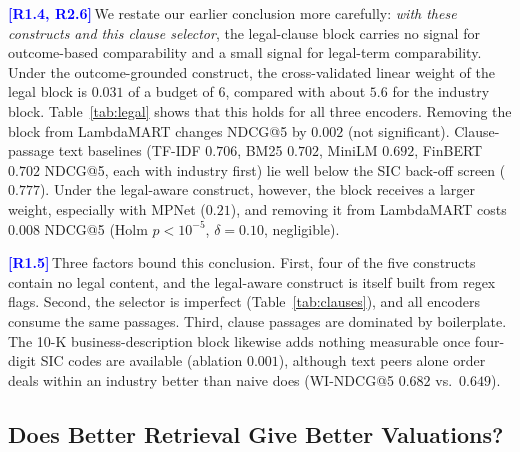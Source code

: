 \documentclass[conference]{IEEEtran}
\newcommand{\rc}[1]{\textcolor{blue}{\textbf{[#1]}}\,}
\newcommand{\rc}[1]{}
\begin{document}
\rc{R1.4, R2.6}We restate our earlier conclusion more carefully: \emph{with these constructs and this clause selector}, the legal-clause block carries no signal for outcome-based comparability and a small signal for legal-term comparability. Under the outcome-grounded construct, the cross-validated linear weight of the legal block is $0.031$ of a budget of $6$, compared with about $5.6$ for the industry block. Table~\ref{tab:legal} shows that this holds for all three encoders. Removing the block from LambdaMART changes NDCG@5 by $0.002$ (not significant). Clause-passage text baselines (TF-IDF $0.706$, BM25 $0.702$, MiniLM $0.692$, FinBERT $0.702$ NDCG@5, each with industry first) lie well below the SIC back-off screen ($0.777$). Under the legal-aware construct, however, the block receives a larger weight, especially with MPNet ($0.21$), and removing it from LambdaMART costs $0.008$ NDCG@5 (Holm $p<10^{-5}$, $\delta=0.10$, negligible).

\begin{table}[t]
\centering
\caption{Cross-validated linear weight of the legal-clause block (budget 6; range over folds) by encoder and construct.}
\label{tab:legal}
\footnotesize
\setlength{\tabcolsep}{3pt}
\end{table}

\rc{R1.5}Three factors bound this conclusion. First, four of the five constructs contain no legal content, and the legal-aware construct is itself built from regex flags. Second, the selector is imperfect (Table~\ref{tab:clauses}), and all encoders consume the same passages. Third, clause passages are dominated by boilerplate. The 10-K business-description block likewise adds nothing measurable once four-digit SIC codes are available (ablation $0.001$), although text peers alone order deals within an industry better than naive does (WI-NDCG@5 $0.682$ vs.\ $0.649$).

\subsection{Does Better Retrieval Give Better Valuations?}
\label{sec:valuation}
\end{document}
